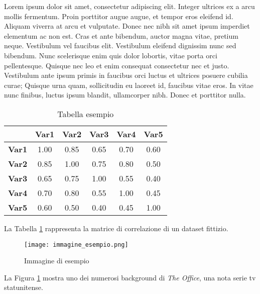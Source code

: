 Lorem ipsum dolor sit amet, consectetur adipiscing elit. Integer ultrices ex a arcu mollis fermentum. Proin porttitor augue augue, et tempor eros eleifend id. Aliquam viverra at arcu et vulputate. Donec nec nibh sit amet ipsum imperdiet elementum ac non est. Cras et ante bibendum, auctor magna vitae, pretium neque. Vestibulum vel faucibus elit. Vestibulum eleifend dignissim nunc sed bibendum. Nunc scelerisque enim quis dolor lobortis, vitae porta orci pellentesque. Quisque nec leo et enim consequat consectetur nec et justo. Vestibulum ante ipsum primis in faucibus orci luctus et ultrices posuere cubilia curae; Quisque urna quam, sollicitudin eu laoreet id, faucibus vitae eros. In vitae nunc finibus, luctus ipsum blandit, ullamcorper nibh. Donec et porttitor nulla.\vspace{12pt}

\begin{table}[ht]
    \centering
    \begin{tabular}{|c|c|c|c|c|c|}
        \hline
        & \textbf{Var1} & \textbf{Var2} & \textbf{Var3} & \textbf{Var4} & \textbf{Var5} \\
        \hline
        \textbf{Var1} & 1.00 & 0.85 & 0.65 & 0.70 & 0.60 \\
        \hline
        \textbf{Var2} & 0.85 & 1.00 & 0.75 & 0.80 & 0.50 \\
        \hline
        \textbf{Var3} & 0.65 & 0.75 & 1.00 & 0.55 & 0.40 \\
        \hline
        \textbf{Var4} & 0.70 & 0.80 & 0.55 & 1.00 & 0.45 \\
        \hline
        \textbf{Var5} & 0.60 & 0.50 & 0.40 & 0.45 & 1.00 \\
        \hline
      \end{tabular}
      \caption{Tabella esempio}
      \label{tab:tabella-esempio}
\end{table}\vspace{12pt}

La Tabella \ref{tab:tabella-esempio} rappresenta la matrice di correlazione di un dataset fittizio.
\newpage %

\begin{figure}[ht]
    \centering
    \texttt{[image: immagine\_esempio.png]}
    \caption{Immagine di esempio}
    \label{fig:immagine-esempio}
\end{figure}

La Figura \ref{fig:immagine-esempio} mostra uno dei numerosi background di \textit{The Office}, una nota serie tv statunitense.\vspace{12pt}

